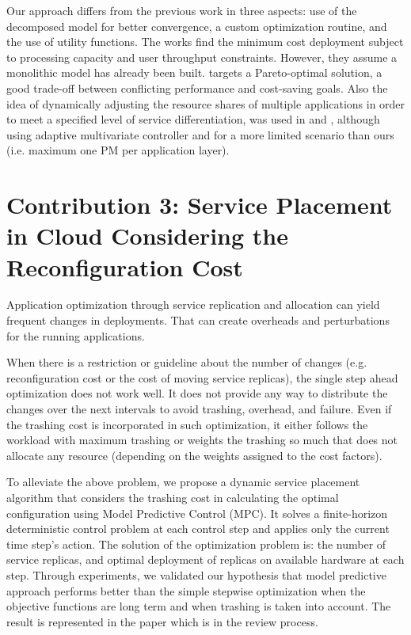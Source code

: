 \documentclass[11pt]{article}
\begin{document}
Our approach differs from the previous work in three aspects: use of the decomposed model for better convergence, a custom optimization routine, and the use of utility functions. The works \cite{li_fast_2009,li_performance_2009} find the minimum cost deployment subject to processing capacity and user throughput constraints. However, they assume a monolithic model has already been built.
\cite{soror_automatic_2010} targets a Pareto-optimal solution, a good trade-off between conflicting performance and cost-saving goals. Also the idea of dynamically adjusting the resource shares of multiple applications in order to meet a specified level of service differentiation, was used in \cite{liu_optimal_2007} and \cite{lim_automated_2009}, although using adaptive multivariate controller and for a more limited scenario than ours (i.e. maximum one PM per application layer).

\section{Contribution 3: Service Placement in Cloud Considering the Reconfiguration Cost}  %
Application optimization through service replication and allocation can yield frequent changes in deployments. That can create overheads and perturbations for the running applications.

When there is a restriction or guideline about the number of changes (e.g. reconfiguration cost or the cost of moving service replicas), the single step ahead optimization does not work well. It does not provide any way to distribute the changes over the next intervals to avoid trashing, overhead, and failure. Even if the trashing cost is incorporated in such optimization, it either follows the workload with maximum trashing or weights the trashing so much that does not allocate any resource (depending on the weights assigned to the cost factors). 

    To alleviate the above problem, we propose a dynamic service placement algorithm that considers the trashing cost in calculating the optimal configuration using Model Predictive Control (MPC). It solves a finite-horizon deterministic control problem at each control step and applies only the current time step's action. The solution of the optimization problem is: the number of service replicas, and optimal deployment of replicas on available hardware at each step. 
   Through experiments, we validated our hypothesis that model predictive approach performs better than the simple stepwise optimization when the objective functions are long term and when trashing is taken into account. 
   The result is represented in the paper \cite{ghanbari2014mpc} which is in the review process. 
  
\end{document}
